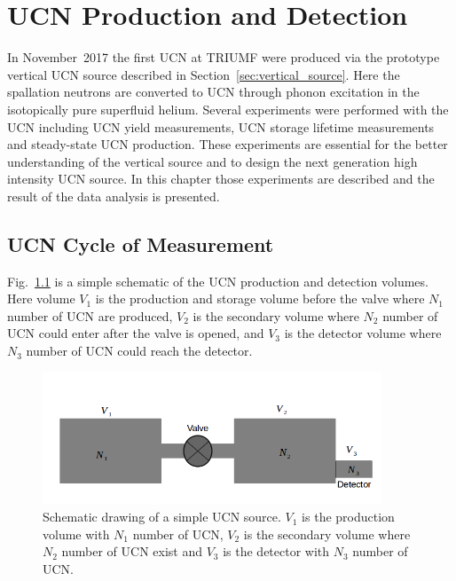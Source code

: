 \chapter{UCN Production and Detection\label{chap:UCNresult}}

In November~2017 the first UCN at TRIUMF were produced via the
prototype vertical UCN source described in
Section~\ref{sec:vertical_source}. Here the spallation neutrons are
converted to UCN through phonon excitation in the isotopically pure
superfluid helium. Several experiments were performed with the UCN
including UCN yield measurements, UCN storage lifetime measurements
and steady-state UCN production. These experiments are essential for
the better understanding of the vertical source and to design the next
generation high intensity UCN source. In this chapter those
experiments are described and the result of the data analysis is
presented.

\section{UCN Cycle of Measurement}
Fig.~\ref{fig:volume_schematic} is a simple schematic of the UCN
production and detection volumes. Here volume $V_1$ is the production
and storage volume before the valve where $N_1$ number of UCN are
produced, $V_2$ is the secondary volume where $N_2$ number of UCN
could enter after the valve is opened, and $V_3$ is the detector
volume where $N_3$ number of UCN could reach the detector.



\begin{figure}[h]
  \centering
  \includegraphics[width=0.9\textwidth]{volume_schematic.png}
  \caption{Schematic drawing of a simple UCN source. $V_1$ is the
    production volume with $N_1$ number of UCN, $V_2$ is the secondary
    volume where $N_2$ number of UCN exist and $V_3$ is the detector
    with $N_3$ number of UCN. }
  \label{fig:volume_schematic}
\end{figure}

